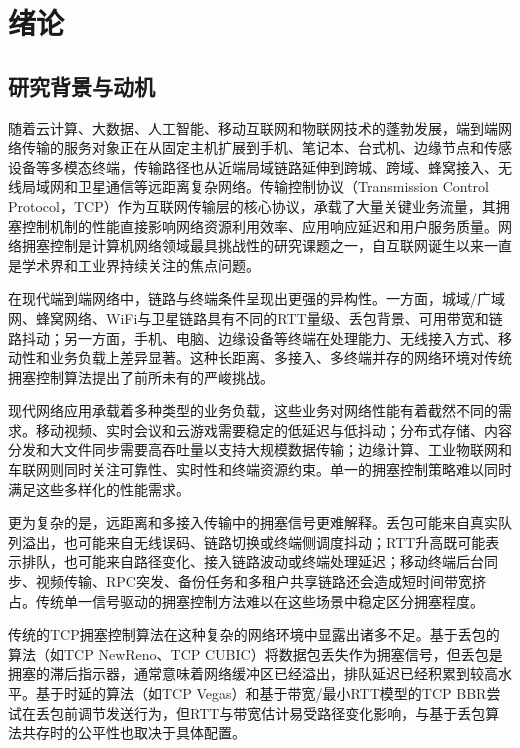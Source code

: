 \chapter{绪论}\label{Chap:chap1}

\section{研究背景与动机}

随着云计算、大数据、人工智能、移动互联网和物联网技术的蓬勃发展，端到端网络传输的服务对象正在从固定主机扩展到手机、笔记本、台式机、边缘节点和传感设备等多模态终端，传输路径也从近端局域链路延伸到跨城、跨域、蜂窝接入、无线局域网和卫星通信等远距离复杂网络。传输控制协议（Transmission Control Protocol，TCP）作为互联网传输层的核心协议，承载了大量关键业务流量，其拥塞控制机制的性能直接影响网络资源利用效率、应用响应延迟和用户服务质量。网络拥塞控制是计算机网络领域最具挑战性的研究课题之一，自互联网诞生以来一直是学术界和工业界持续关注的焦点问题。

在现代端到端网络中，链路与终端条件呈现出更强的异构性。一方面，城域/广域网、蜂窝网络、WiFi与卫星链路具有不同的RTT量级、丢包背景、可用带宽和链路抖动；另一方面，手机、电脑、边缘设备等终端在处理能力、无线接入方式、移动性和业务负载上差异显著。这种长距离、多接入、多终端并存的网络环境对传统拥塞控制算法提出了前所未有的严峻挑战。

现代网络应用承载着多种类型的业务负载，这些业务对网络性能有着截然不同的需求。移动视频、实时会议和云游戏需要稳定的低延迟与低抖动；分布式存储、内容分发和大文件同步需要高吞吐量以支持大规模数据传输；边缘计算、工业物联网和车联网则同时关注可靠性、实时性和终端资源约束。单一的拥塞控制策略难以同时满足这些多样化的性能需求。

更为复杂的是，远距离和多接入传输中的拥塞信号更难解释。丢包可能来自真实队列溢出，也可能来自无线误码、链路切换或终端侧调度抖动；RTT升高既可能表示排队，也可能来自路径变化、接入链路波动或终端处理延迟；移动终端后台同步、视频传输、RPC突发、备份任务和多租户共享链路还会造成短时间带宽挤占。传统单一信号驱动的拥塞控制方法难以在这些场景中稳定区分拥塞程度。

传统的TCP拥塞控制算法在这种复杂的网络环境中显露出诸多不足。基于丢包的算法（如TCP NewReno、TCP CUBIC）将数据包丢失作为拥塞信号，但丢包是拥塞的滞后指示器，通常意味着网络缓冲区已经溢出，排队延迟已经积累到较高水平。基于时延的算法（如TCP Vegas）和基于带宽/最小RTT模型的TCP BBR尝试在丢包前调节发送行为，但RTT与带宽估计易受路径变化影响，与基于丢包算法共存时的公平性也取决于具体配置。

